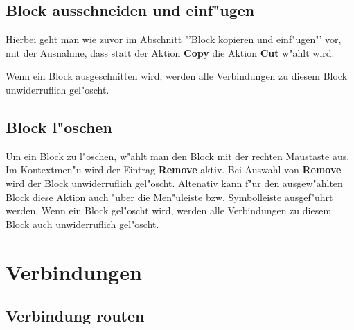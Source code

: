 \documentclass[a4paper,titlepage,12pt,ngerman]{scrbook}
\begin{document}
\subsection{Block ausschneiden und einf"ugen}
Hierbei geht man wie zuvor im Abschnitt "'Block kopieren und einf"ugen"' vor, mit der Ausnahme, dass statt der Aktion {\bf Copy} die Aktion {\bf Cut} w"ahlt wird. \par
Wenn ein Block ausgeschnitten wird, werden alle Verbindungen zu diesem Block unwiderruflich gel"oscht.


\subsection{Block l"oschen}
Um ein Block zu l"oschen, w"ahlt man den Block mit der rechten Maustaste aus. Im Kontextmen"u wird der Eintrag {\bf Remove} aktiv. Bei Auswahl von {\bf Remove} wird der Block unwiderruflich gel"oscht.\newline
Altenativ kann f"ur den ausgew"ahlten Block diese Aktion auch "uber die Men"uleiste bzw. Symbolleiste ausgef"uhrt werden.\newline
Wenn ein Block gel"oscht wird, werden alle Verbindungen zu diesem Block auch unwiderruflich gel"oscht.


\newpage
\section{Verbindungen}
\subsection{Verbindung routen}
\end{document}

